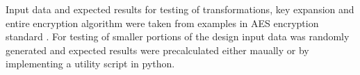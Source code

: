 Input data and expected results for testing of transformations, key expansion and entire encryption algorithm were taken from examples in AES encryption standard \cite{aes-standard}. For testing of smaller portions of the design input data was randomly generated and expected results were precalculated either maually or by implementing a utility script in python.
